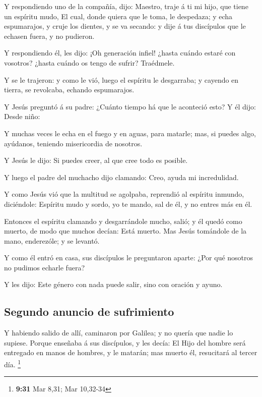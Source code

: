  Y respondiendo uno de la compañía, dijo: Maestro, traje
á ti mi hijo, que tiene un espíritu mudo,  El cual, donde
quiera que le toma, le despedaza; y echa espumarajos, y cruje los
dientes, y se va secando: y dije á tus discípulos que le echasen fuera,
y no pudieron.

 Y respondiendo él, les dijo: ¡Oh generación infiel!
¿hasta cuándo estaré con vosotros? ¿hasta cuándo os tengo de sufrir?
Traédmele.

 Y se le trajeron: y como le vió, luego el espíritu le
desgarraba; y cayendo en tierra, se revolcaba, echando espumarajos.

 Y Jesús preguntó á su padre: ¿Cuánto tiempo há que le
aconteció esto? Y él dijo: Desde niño:

 Y muchas veces le echa en el fuego y en aguas, para
matarle; mas, si puedes algo, ayúdanos, teniendo misericordia de
nosotros.

 Y Jesús le dijo: Si puedes creer, al que cree todo es
posible.

 Y luego el padre del muchacho dijo clamando: Creo, ayuda
mi incredulidad.

 Y como Jesús vió que la multitud se agolpaba, reprendió
al espíritu inmundo, diciéndole: Espíritu mudo y sordo, yo te mando, sal
de él, y no entres más en él.

 Entonces el espíritu clamando y desgarrándole mucho,
salió; y él quedó como muerto, de modo que muchos decían: Está muerto.
 Mas Jesús tomándole de la mano, enderezóle; y se
levantó.

 Y como él entró en casa, sus discípulos le preguntaron
aparte: ¿Por qué nosotros no pudimos echarle fuera?

 Y les dijo: Este género con nada puede salir, sino con
oración y ayuno.

\hypertarget{segundo-anuncio-de-sufrimiento}{%
\subsection{Segundo anuncio de
sufrimiento}\label{segundo-anuncio-de-sufrimiento}}

 Y habiendo salido de allí, caminaron por Galilea; y no
quería que nadie lo supiese.  Porque enseñaba á sus
discípulos, y les decía: El Hijo del hombre será entregado en manos de
hombres, y le matarán; mas muerto él, resucitará al tercer día.
\footnote{\textbf{9:31} Mar 8,31; Mar 10,32-34}

